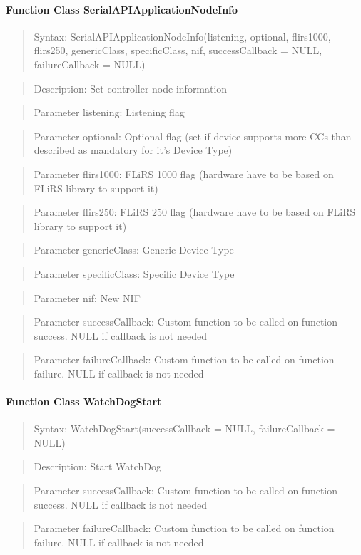 \paragraph{Function Class SerialAPIApplicationNodeInfo}
\begin{quote}Syntax: SerialAPIApplicationNodeInfo(listening, optional, flirs1000, flirs250, genericClass, specificClass, nif, successCallback = NULL, failureCallback = NULL)\end{quote}
\begin{quote}Description: Set controller node information\end{quote}
\begin{quote}Parameter listening: Listening flag\end{quote}
\begin{quote}Parameter optional: Optional flag (set if device supports more CCs than described as mandatory for it's Device Type)\end{quote}
\begin{quote}Parameter flirs1000: FLiRS 1000 flag (hardware have to be based on FLiRS library to support it)\end{quote}
\begin{quote}Parameter flirs250: FLiRS 250 flag (hardware have to be based on FLiRS library to support it)\end{quote}
\begin{quote}Parameter genericClass: Generic Device Type\end{quote}
\begin{quote}Parameter specificClass: Specific Device Type\end{quote}
\begin{quote}Parameter nif: New NIF\end{quote}
\begin{quote}Parameter successCallback: Custom function to be called on function success. NULL if callback is not needed\end{quote}
\begin{quote}Parameter failureCallback: Custom function to be called on function failure. NULL if callback is not needed\end{quote}


\paragraph{Function Class WatchDogStart}
\begin{quote}Syntax: WatchDogStart(successCallback = NULL, failureCallback = NULL)\end{quote}
\begin{quote}Description: Start WatchDog\end{quote}
\begin{quote}Parameter successCallback: Custom function to be called on function success. NULL if callback is not needed\end{quote}
\begin{quote}Parameter failureCallback: Custom function to be called on function failure. NULL if callback is not needed\end{quote}


